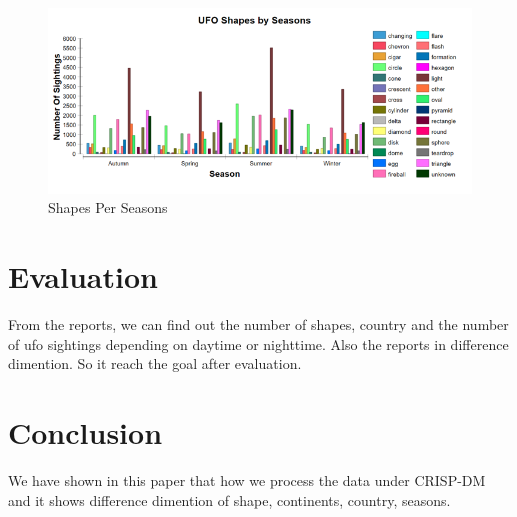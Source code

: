 \documentclass[11pt, journal]{IEEEtran}
\begin{document}
\begin{itemize}
\begin{figure}[htb]
            \label{fig:shape-continent}
        \end{figure}
        \begin{figure}[htb]
            \centering
                \includegraphics[width=1.0\columnwidth]{images/shapes-seasons}
            \caption{Shapes Per Seasons}
            \label{fig:shape-season}
        \end{figure}
\end{itemize}


\section{Evaluation} \label{sec:Evaluation}
From the reports, we can find out the number of shapes, country and the number of ufo sightings depending on daytime or nighttime. Also the reports in difference dimention. So it reach the goal after evaluation.

\section{Conclusion} \label{sec:concl}
We have shown in this paper that how we process the data under CRISP-DM and it shows difference dimention of shape, continents, country, seasons. 



\end{document}
